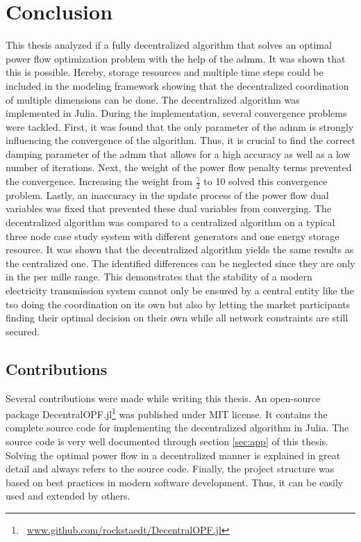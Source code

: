 \section{Conclusion}

This thesis analyzed if a fully decentralized algorithm that solves an optimal power flow optimization problem with the help of the \gls{admm}. It was shown that this is possible. Hereby, storage resources and multiple time steps could be included in the modeling framework showing that the decentralized coordination of multiple dimensions can be done. The decentralized algorithm was implemented in Julia. During the implementation, several convergence problems were tackled. First, it was found that the only parameter of the \gls{admm} is strongly influencing the convergence of the algorithm. Thus, it is crucial to find the correct damping parameter of the \gls{admm} that allows for a high accuracy as well as a low number of iterations. Next, the weight of the power flow penalty terms prevented the convergence. Increasing the weight from $\frac{\gamma}{2}$ to 10 solved this convergence problem. Lastly, an inaccuracy in the update process of the power flow dual variables was fixed that prevented these dual variables from converging. The decentralized algorithm was compared to a centralized algorithm on a typical three node case study system with different generators and one energy storage resource. It was shown that the decentralized algorithm yields the same results as the centralized one. The identified differences can be neglected since they are only in the per mille range. This demonstrates that the stability of a modern electricity transmission system cannot only be ensured by a central entity like the \gls{tso} doing the coordination on its own but also by letting the market participants finding their optimal decision on their own while all network constraints are still secured.

\subsection{Contributions}

Several contributions were made while writing this thesis. An open-source package DecentralOPF.jl\footnote{~\url{www.github.com/rockstaedt/DecentralOPF.jl}} was published under MIT license. It contains the complete source code for implementing the decentralized algorithm in Julia. The source code is very well documented through section \ref{sec:app} of this thesis. Solving the optimal power flow in a decentralized manner is explained in great detail and always refers to the source code. Finally, the project structure was based on best practices in modern software development. Thus, it can be easily used and extended by others.

